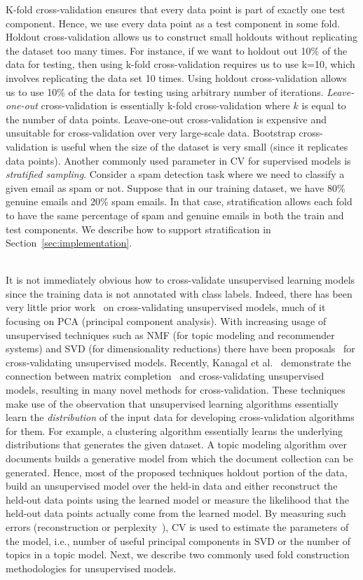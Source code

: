 \documentclass{vldb}
\newcommand{\topic}[1]{\par \smallskip \smallskip \noindent{\bf \uline{#1}}}
\begin{document}
K-fold cross-validation ensures that every data point is part of exactly one
test component. Hence, we use every data point as a test component in some fold.
Holdout cross-validation allows us to construct small holdouts without
replicating the dataset too many times. For instance, if we want to holdout out
10\% of the data for testing, then using k-fold cross-validation requires us to
use k=10, which involves replicating the data set 10 times. Using holdout
cross-validation allows us to use 10\% of the data for testing using arbitrary
number of iterations. {\em Leave-one-out} cross-validation is essentially k-fold
cross-validation where $k$ is equal to the number of data points.  Leave-one-out
cross-validation is expensive and unsuitable for cross-validation over very
large-scale data. Bootstrap cross-validation is useful when the size of the
dataset is very small (since it replicates data points). Another commonly used
parameter in CV for supervised models is {\em stratified sampling}.  Consider a
spam detection task where we need to classify a given email as spam or not.
Suppose that in our training dataset, we have 80\% genuine emails and 20\% spam
emails. In that case, stratification allows each fold to have the same
percentage of spam and genuine emails in both the train and test components. We
describe how to support stratification in Section~\ref{sec:implementation}.

\topic{Unsupervised learning:}\\
It is not immediately obvious how to cross-validate unsupervised learning models
since the training data is not annotated with class labels. Indeed, there has
been very little prior work~\cite{wold,gabriel} on cross-validating unsupervised
models, much of it focusing on PCA (principal component analysis).
With increasing usage of unsupervised techniques such as NMF (for topic
modeling and recommender systems) and SVD (for dimensionality reductions) there have been
proposals~\cite{PerryO09,nips2010} for cross-validating unsupervised models.
Recently, Kanagal et al.~\cite{nips2010} demonstrate the connection
between matrix completion~\cite{CandesTao} and cross-validating unsupervised
models, resulting in many novel methods for cross-validation.
These techniques make use of the observation that unsupervised learning
algorithms essentially learn the {\em distribution} of the input data for
developing cross-validation algorithms for them. For example, a clustering
algorithm essentially learns the underlying distributions that generates the
given dataset. A topic modeling algorithm over
documents builds a generative model from which the document collection can be
generated. Hence, most of the proposed techniques holdout
portion of the data, build an unsupervised model over the held-in data and
either reconstruct the held-out data points using the learned model or measure the
likelihood that the held-out data points actually come from the learned model.
By measuring such errors (reconstruction or
perplexity~\cite{DBLP:journals/jmlr/BleiNJ03}), CV is used to estimate the parameters of the
model, i.e., number of useful principal components in SVD or the number of
topics in a topic model. Next, we describe two commonly used fold construction methodologies for
unsupervised models.
\end{document}

